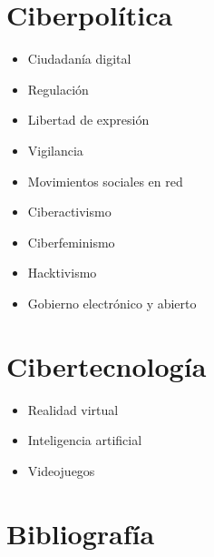 \documentclass[]{book}
\providecommand{\tightlist}{%
  \setlength{\itemsep}{0pt}\setlength{\parskip}{0pt}}
\begin{document}
\hypertarget{ciberpoluxedtica}{%
\section{Ciberpolítica}\label{ciberpoluxedtica}}

\begin{itemize}
\tightlist
\item
  Ciudadanía digital
\item
  Regulación
\item
  Libertad de expresión
\item
  Vigilancia
\item
  Movimientos sociales en red
\item
  Ciberactivismo
\item
  Ciberfeminismo
\item
  Hacktivismo
\item
  Gobierno electrónico y abierto
\end{itemize}

\hypertarget{cibertecnologuxeda}{%
\section{Cibertecnología}\label{cibertecnologuxeda}}

\begin{itemize}
\tightlist
\item
  Realidad virtual
\item
  Inteligencia artificial
\item
  Videojuegos
\end{itemize}

\hypertarget{bibliografuxeda-2}{%
\section*{Bibliografía}\label{bibliografuxeda-2}}
\end{document}
